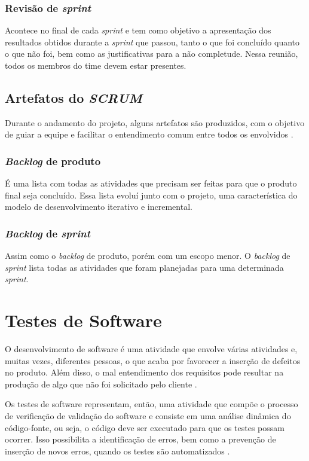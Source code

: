 \subsubsection{Revisão de \textit{sprint}}
Acontece no final de cada \textit{sprint} e tem como objetivo a apresentação dos resultados obtidos durante a \textit{sprint} que passou, tanto o que foi concluído quanto o que não foi, bem como as justificativas para a não completude. Nessa reunião, todos os membros do time devem estar presentes.

\subsection{Artefatos do \textit{SCRUM}}
Durante o andamento do projeto, alguns artefatos são produzidos, com o objetivo de guiar a equipe e facilitar o entendimento comum entre todos os envolvidos \cite{sutherland2013}.

\subsubsection{\textit{Backlog} de produto}
É uma lista com todas as atividades que precisam ser feitas para que o produto final seja concluído. Essa lista evoluí junto com o projeto, uma característica do modelo de desenvolvimento iterativo e incremental.

\subsubsection{\textit{Backlog} de \textit{sprint}}
Assim como o \textit{backlog} de produto, porém com um escopo menor. O \textit{backlog} de \textit{sprint} lista todas as atividades que foram planejadas para uma determinada \textit{sprint}.

\section{Testes de Software}
O desenvolvimento de software é uma atividade que envolve várias atividades e, muitas vezes, diferentes pessoas, o que acaba por favorecer a inserção de defeitos no produto. Além disso, o mal entendimento dos requisitos pode resultar na produção de algo que não foi solicitado pelo cliente \cite{trodo2009}.

Os testes de software representam, então, uma atividade que compõe o processo de verificação de validação do software e consiste em uma análise dinâmica do código-fonte, ou seja, o código deve ser executado para que os testes possam ocorrer. Isso possibilita a identificação de erros, bem como a prevenção de inserção de novos erros, quando os testes são automatizados \cite{barbosa2009}.

